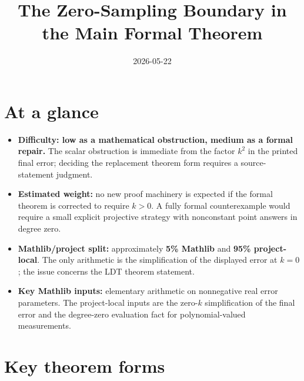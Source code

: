 \documentclass[11pt]{article}
\title{The Zero-Sampling Boundary in the Main Formal Theorem}
\author{}
\date{2026-05-22}
\begin{document}
\maketitle

\section{At a glance}

\begin{itemize}
  \item \textbf{Difficulty: low as a mathematical obstruction, medium as a
  formal repair.}  The scalar obstruction is immediate from the factor \(k^2\)
  in the printed final error; deciding the replacement theorem form requires a
  source-statement judgment.
  \item \textbf{Estimated weight:} no new proof machinery is expected if the
  formal theorem is corrected to require \(k>0\).  A fully formal
  counterexample would require a small explicit projective strategy with
  nonconstant point answers in degree zero.
  \item \textbf{Mathlib/project split:} approximately \textbf{5\% Mathlib} and
  \textbf{95\% project-local}.  The only arithmetic is the simplification of the
  displayed error at \(k=0\); the issue concerns the LDT theorem statement.
  \item \textbf{Key Mathlib inputs:} elementary arithmetic on nonnegative real
  error parameters.  The project-local inputs are the zero-\(k\) simplification
  of the final error and the degree-zero evaluation fact for polynomial-valued
  measurements.
\end{itemize}

\section{Key theorem forms}
\end{document}
